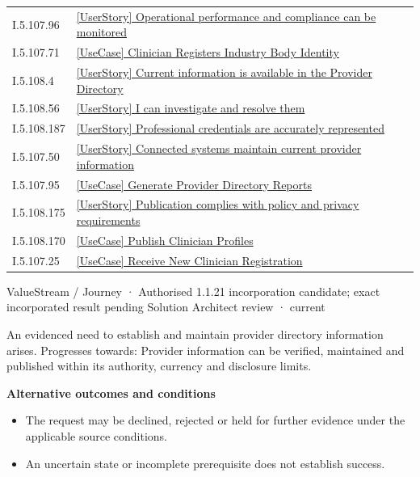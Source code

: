 \begin{longtable}{p{.22\linewidth}p{.73\linewidth}}
I.5.107.96 & \hyperref[element:f9d873d8a62e400d9a9854d894e1496d]{[UserStory] Operational performance and compliance can be monitored} \\
I.5.107.71 & \hyperref[element:faa8aa8afb0e4a6f903e313c0cfac583]{[UseCase] Clinician Registers Industry Body Identity} \\
I.5.108.4 & \hyperref[element:fcdfdb5dedd2410f8d0301a34cfce1d6]{[UserStory] Current information is available in the Provider Directory} \\
I.5.108.56 & \hyperref[element:fd412967e3bd45d18f175aa85f9994bc]{[UserStory] I can investigate and resolve them} \\
I.5.108.187 & \hyperref[element:fd7b69f64bc1432b8bec4ddda0fdcf56]{[UserStory] Professional credentials are accurately represented} \\
I.5.107.50 & \hyperref[element:fd878a2c228a4d5da609d31c5b72d840]{[UserStory] Connected systems maintain current provider information} \\
I.5.107.95 & \hyperref[element:ff39e74a476f44fdb8e07c4ca9e38b73]{[UseCase] Generate Provider Directory Reports} \\
I.5.108.175 & \hyperref[element:ff5db2be514746ed8336cd7136935f59]{[UserStory] Publication complies with policy and privacy requirements} \\
I.5.108.170 & \hyperref[element:ffbca54a8d534d1ea12407ebc7f1e9c2]{[UseCase] Publish Clinician Profiles} \\
I.5.107.25 & \hyperref[element:fff7b4972abd40ebb006ed514113269e]{[UseCase] Receive New Clinician Registration} \\
\end{longtable}
\label{element:679b0055ee5d42d4a838e35edd3de01f}
{\small ValueStream / Journey · Authorised 1.1.21 incorporation candidate; exact incorporated result pending Solution Architect review · current}\par

An evidenced need to establish and maintain provider directory information arises. Progresses towards: Provider information can be verified, maintained and published within its authority, currency and disclosure limits.



\par\medskip\textbf{Alternative outcomes and conditions}\par


\begin{itemize}


\item The request may be declined, rejected or held for further evidence under the applicable source conditions.

\item An uncertain state or incomplete prerequisite does not establish success.

\end{itemize}


